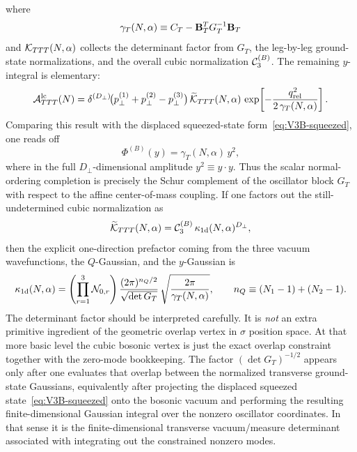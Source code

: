 \documentclass[11pt]{article}
\numberwithin{equation}{section}
\newcommand{\perpD}{D_\perp}
\begin{document}
where
\begin{equation}
\gamma_T(N,\alpha)
\equiv
C_T - {\bf B}_T^T G_T^{-1} {\bf B}_T
\label{eq:gammaT}
\end{equation}
and ${\cal K}_{TTT}(N,\alpha)$ collects the determinant factor from $G_T$, the leg-by-leg ground-state normalizations, and the overall cubic normalization ${\cal C}_3^{(B)}$. The remaining $y$-integral is elementary:
\begin{equation}
\label{eq:s12-1-015}
{\cal A}_{TTT}^{\mathrm{lc}}(N)
=
\delta^{(\perpD)}\!\bigl(p_\perp^{(1)}+p_\perp^{(2)}-p_\perp^{(3)}\bigr)\,
\widetilde{\cal K}_{TTT}(N,\alpha)\,
\exp\!\left[
-\frac{q_{\mathrm{rel}}^2}{2\,\gamma_T(N,\alpha)}
\right].
\end{equation}
Comparing this result with the displaced squeezed-state form~\eqref{eq:V3B-squeezed}, one reads off
\begin{equation}
\label{eq:s12-1-016}
\Phi^{(B)}(y)=\gamma_T(N,\alpha)\,y^2,
\end{equation}
where in the full $\perpD$-dimensional amplitude $y^2\equiv y\cdot y$. Thus the scalar normal-ordering completion is precisely the Schur complement of the oscillator block $G_T$ with respect to the affine center-of-mass coupling.
If one factors out the still-undetermined cubic normalization as
\begin{equation}
\label{eq:s12-1-017}
\widetilde{\cal K}_{TTT}(N,\alpha)
=
{\cal C}_3^{(B)}\,\kappa_{1\mathrm d}(N,\alpha)^{\perpD},
\end{equation}
then the explicit one-direction prefactor coming from the three vacuum wavefunctions, the $Q$-Gaussian, and the $y$-Gaussian is
\begin{equation}
\label{eq:s12-1-018}
\kappa_{1\mathrm d}(N,\alpha)
=
\left(\prod_{r=1}^3 {\cal N}_{0,r}\right)
\frac{(2\pi)^{n_Q/2}}{\sqrt{\det G_T}}\,
\sqrt{\frac{2\pi}{\gamma_T(N,\alpha)}},
\qquad
n_Q\equiv (N_1-1)+(N_2-1).
\end{equation}
The determinant factor should be interpreted carefully. It is \emph{not} an extra primitive ingredient of the geometric overlap vertex in $\sigma$ position space. At that more basic level the cubic bosonic vertex is just the exact overlap constraint together with the zero-mode bookkeeping. The factor $(\det G_T)^{-1/2}$ appears only after one evaluates that overlap between the normalized transverse ground-state Gaussians, equivalently after projecting the displaced squeezed state~\eqref{eq:V3B-squeezed} onto the bosonic vacuum and performing the resulting finite-dimensional Gaussian integral over the nonzero oscillator coordinates. In that sense it is the finite-dimensional transverse vacuum/measure determinant associated with integrating out the constrained nonzero modes.
\end{document}
